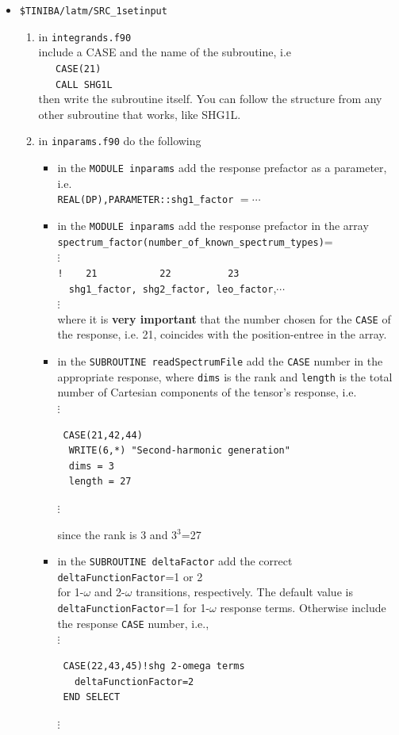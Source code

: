 \documentclass[12pt,leqno]{article}
\numberwithin{equation}{section}
\begin{document}
\begin{itemize}
\item\verb=$TINIBA/latm/SRC_1setinput=

\begin{enumerate}
\item in
  \verb=integrands.f90=\\
 include a CASE and the name of the subroutine, i.e \\
\verb=   CASE(21)=\\
\verb=   CALL SHG1L=\\
then write the subroutine itself. You can follow the structure from
  any other subroutine that works, like SHG1L. 

\item in \verb=inparams.f90= do the following
\begin{itemize}
\item in the \verb=MODULE inparams= 
add the response prefactor as a parameter, i.e.\\
\verb=REAL(DP),PARAMETER::shg1_factor= $=\cdots$
\item in the \verb=MODULE inparams=  add the response prefactor in the array\\
\verb=spectrum_factor(number_of_known_spectrum_types)==\\       
$\vdots$\\
\verb=!    21           22          23           =\\
\verb=  shg1_factor, shg2_factor, leo_factor=,$\cdots$\\
$\vdots$\\
where it is {\bf very important} that the number chosen for the
\verb=CASE= of the response, i.e. 21, coincides with the position-entree in
the array.
\item in the \verb=SUBROUTINE readSpectrumFile= add the \verb=CASE=
 number in the appropriate response, where \verb=dims= is the rank
 and \verb=length= is the total number of
 Cartesian components of
the tensor's response, i.e.\\
$\vdots$
\begin{verbatim}
 CASE(21,42,44)
  WRITE(6,*) "Second-harmonic generation"
  dims = 3
  length = 27
\end{verbatim}
$\vdots$

since the rank is 3 and 3$^3$=27

\item in the \verb=SUBROUTINE deltaFactor= add the 
correct\\ \verb=deltaFunctionFactor==1 or 2\\ for 1-$\omega$ and 
2-$\omega$ transitions, respectively.
 The default value is\\
\verb=deltaFunctionFactor==1 for 1-$\omega$ response terms.
Otherwise include the response \verb=CASE= number, i.e.,\\
$\vdots$
\begin{verbatim}
 CASE(22,43,45)!shg 2-omega terms
   deltaFunctionFactor=2
 END SELECT
\end{verbatim}
$\vdots$


\end{itemize}
\end{enumerate}
\end{itemize}
\end{document}
